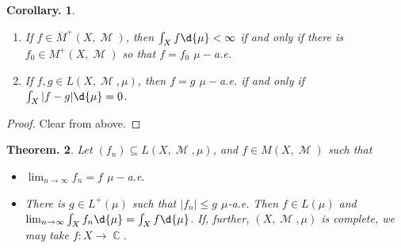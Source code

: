 \documentclass[11pt, a4paper]{memoir}
\DeclareMathOperator{\C}{{\mathbb{C}}}
\theoremstyle{change}
\newtheorem{theorem}{Theorem.}[section]
\newtheorem{corollary}[theorem]{Corollary.}
\theoremstyle{plain}
\theoremstyle{nonumberplain}
\newtheorem{proof}{Proof}
\DeclareMathOperator{\M}{{\mathcal{M}}}
\begin{document}
\begin{corollary}
    \begin{enumerate}
        \item If $f\in\overline{M}^+(X,\M)$, then $\int_Xf\d{\mu}<\infty$ if and only if there is $f_0\in M^+(X,\M)$ so that $f=f_0$ $\mu-$a.e.
        \item If $f,g\in L(X,\M,\mu)$, then $f=g$ $\mu-$a.e. if and only if $\int_X|f-g|\d{\mu}=0$.
    \end{enumerate}
\end{corollary}
\begin{proof}
    Clear from above.
\end{proof}
\begin{theorem}
    Let $(f_n)\subseteq L(X,\M,\mu)$, and $f\in M(X,\M)$ such that
    \begin{itemize}[nolistsep]
        \item $\lim_{n\to\infty} f_n=f$ $\mu-$a.e.
        \item There is $g\in L^+(\mu)$ such that $|f_n|\leq g$ $\mu$-a.e.
            Then $f\in L(\mu)$ and $\lim_{n\to\infty}\int_X f_n\d{\mu}=\int_X f\d{\mu}$.
            If, further, $(X,\M,\mu)$ is complete, we may take $f:X\to\C$.
    \end{itemize}
\end{theorem}
\end{document}
